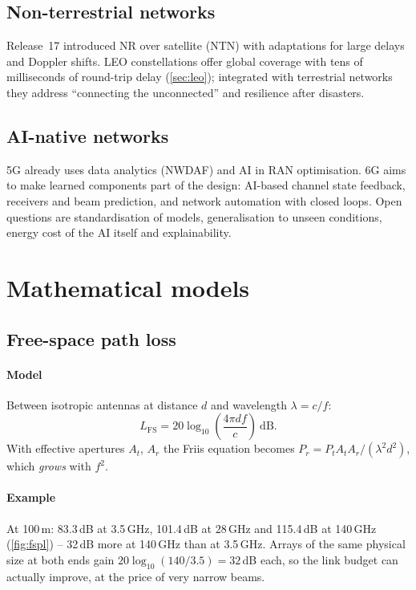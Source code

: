 \documentclass[11pt,a4paper]{article}
\begin{document}
\subsection{Non-terrestrial networks}
Release~17 introduced NR over satellite (NTN) with adaptations for large delays and Doppler shifts. LEO constellations offer global coverage
with tens of milliseconds of round-trip delay (\cref{sec:leo}); integrated with terrestrial networks they address ``connecting the
unconnected'' and resilience after disasters.

\subsection{AI-native networks}
5G already uses data analytics (NWDAF) and AI in RAN optimisation. 6G aims to make learned components part of the design: AI-based channel
state feedback, receivers and beam prediction, and network automation with closed loops. Open questions are standardisation of models,
generalisation to unseen conditions, energy cost of the AI itself and explainability.

\section{Mathematical models}

\subsection{Free-space path loss}\label{sec:fspl}
\paragraph{Model} Between isotropic antennas at distance $d$ and wavelength $\lambda = c/f$:
\begin{equation}\label{eq:fspl}
  L_{\mathrm{FS}} = 20\log_{10}\!\left(\frac{4\pi d f}{c}\right) \ \mathrm{dB}.
\end{equation}
With effective apertures $A_t$, $A_r$ the Friis equation becomes $P_r = P_t A_t A_r/(\lambda^2 d^2)$, which \emph{grows} with $f^2$.
\paragraph{Example} At 100\,m: 83.3\,dB at 3.5\,GHz, 101.4\,dB at 28\,GHz and 115.4\,dB at 140\,GHz (\cref{fig:fspl}) -- 32\,dB more at 140\,GHz than at 3.5\,GHz.
Arrays of the same physical size at both ends gain $20\log_{10}(140/3.5) = 32$\,dB each, so the link budget can actually improve, at the price of
very narrow beams.
\end{document}
